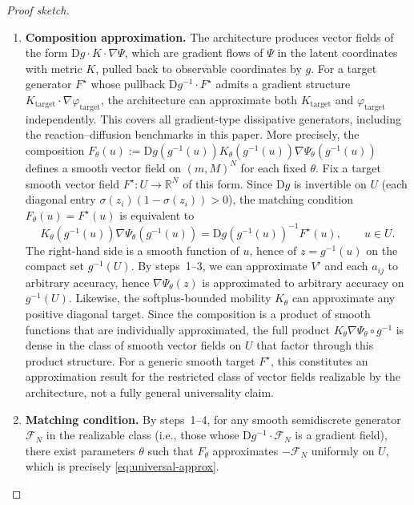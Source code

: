 \documentclass[11pt]{article}
\newcommand{\R}{\mathbb{R}}
\newcommand{\cFN}{\mathcal{F}_N}
\begin{document}
\begin{proof}[Proof sketch]
\begin{enumerate}
    \item \textbf{Composition approximation.} The architecture produces vector fields of the form $\mathrm{D}g\cdot K\cdot\nabla\Psi$, which are gradient flows of $\Psi$ in the latent coordinates with metric $K$, pulled back to observable coordinates by $g$. For a target generator $F^{\star}$ whose pullback $\mathrm{D}g^{-1}\cdot F^{\star}$ admits a gradient structure $K_{\mathrm{target}}\cdot\nabla\varphi_{\mathrm{target}}$, the architecture can approximate both $K_{\mathrm{target}}$ and $\varphi_{\mathrm{target}}$ independently. This covers all gradient-type dissipative generators, including the reaction--diffusion benchmarks in this paper. More precisely, the composition $F_{\theta}(u):=\mathrm{D}g(g^{-1}(u))K_{\theta}(g^{-1}(u))\nabla \Psi_{\theta}(g^{-1}(u))$ defines a smooth vector field on $(m,M)^N$ for each fixed $\theta$. Fix a target smooth vector field $F^{\star}:U\to\R^N$ of this form. Since $\mathrm{D}g$ is invertible on $U$ (each diagonal entry $\sigma(z_i)(1-\sigma(z_i))>0$), the matching condition $F_{\theta}(u)=F^{\star}(u)$ is equivalent to
    \begin{equation*}
    K_{\theta}(g^{-1}(u))\nabla \Psi_{\theta}(g^{-1}(u)) = \mathrm{D}g(g^{-1}(u))^{-1}F^{\star}(u), \qquad u\in U.
    \end{equation*}
    The right-hand side is a smooth function of $u$, hence of $z=g^{-1}(u)$ on the compact set $g^{-1}(U)$. By steps~1--3, we can approximate $V'$ and each $a_{ij}$ to arbitrary accuracy, hence $\nabla\Psi_{\theta}(z)$ is approximated to arbitrary accuracy on $g^{-1}(U)$. Likewise, the softplus-bounded mobility $K_{\theta}$ can approximate any positive diagonal target. Since the composition is a product of smooth functions that are individually approximated, the full product $K_{\theta}\nabla\Psi_{\theta}\circ g^{-1}$ is dense in the class of smooth vector fields on $U$ that factor through this product structure. For a generic smooth target $F^{\star}$, this constitutes an approximation result for the restricted class of vector fields realizable by the architecture, not a fully general universality claim.

    \item \textbf{Matching condition.} By steps~1--4, for any smooth semidiscrete generator $\cFN$ in the realizable class (i.e., those whose $\mathrm{D}g^{-1}\cdot \cFN$ is a gradient field), there exist parameters $\theta$ such that $F_{\theta}$ approximates $-\cFN$ uniformly on $U$, which is precisely \eqref{eq:universal-approx}.
\end{enumerate}
\end{proof}
\end{document}
